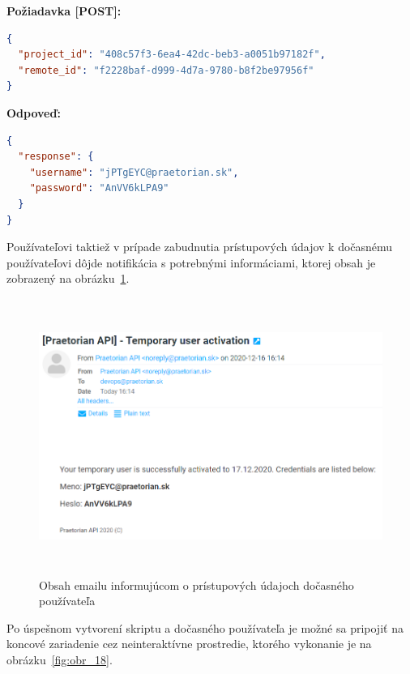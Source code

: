 \textbf{\large Požiadavka [POST]:}

\begin{lstlisting}[language=json,firstnumber=1]
{
  "project_id": "408c57f3-6ea4-42dc-beb3-a0051b97182f",
  "remote_id": "f2228baf-d999-4d7a-9780-b8f2be97956f"
}
\end{lstlisting}

\textbf{\large Odpoveď:}

\begin{lstlisting}[language=json,firstnumber=1]
{
  "response": {
    "username": "jPTgEYC@praetorian.sk",
    "password": "AnVV6kLPA9"
  }
}
\end{lstlisting}

Používateľovi taktiež v prípade zabudnutia prístupových údajov k dočasnému používateľovi dôjde notifikácia s potrebnými
informáciami, ktorej obsah je zobrazený na obrázku~\ref{fig:obr_17}.

\begin{figure}[H]
\begin{center}\includegraphics[width=\textwidth,height=9cm,keepaspectratio=true]{assets/temporary_credentials.png}\end{center}
\caption[Obsah emailu informujúcom o prístupových údajoch dočasného používateľa]{Obsah emailu informujúcom o prístupových údajoch dočasného používateľa}\label{fig:obr_17}
\end{figure}

Po úspešnom vytvorení skriptu a dočasného používateľa je možné sa pripojiť na koncové zariadenie cez neinteraktívne prostredie,
ktorého vykonanie je na obrázku~\ref{fig:obr_18}.

